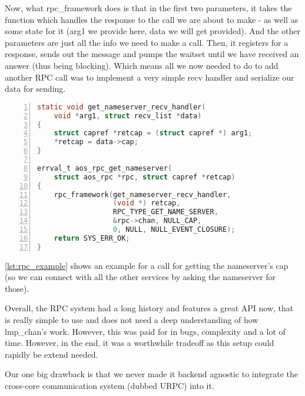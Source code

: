 Now, what rpc\_framework does is that in the first two parameters, it takes 
the function which handles the response to the call we are about to make - as 
well as some state for it (arg1 we provide here, data we will get provided). 
And the other parameters are just all the info we need to make a call.
Then, it registers for a response, sends out the message and 
pumps the waitset until we have received an answer (thus being blocking). 
Which means all we now needed to do to add another RPC call was to implement a 
very simple recv handler and 
serialize our data for sending.
\medskip

\begin{lstlisting}[caption={aos\_rpc\_get with helper function}, 
label=lst:rpc_example, numbers=left, stepnumber=1, float, floatplacement=tl, 
frame=tb, language=c]
static void get_nameserver_recv_handler(
    void *arg1, struct recv_list *data)
{
    struct capref *retcap = (struct capref *) arg1;
    *retcap = data->cap;
}

errval_t aos_rpc_get_nameserver(
    struct aos_rpc *rpc, struct capref *retcap)
{
    rpc_framework(get_nameserver_recv_handler,
                  (void *) retcap,
                  RPC_TYPE_GET_NAME_SERVER, 
                  &rpc->chan, NULL_CAP,
                  0, NULL, NULL_EVENT_CLOSURE);
    return SYS_ERR_OK;
}
\end{lstlisting}

\autoref{lst:rpc_example} shows an example for a call for getting the 
nameserver's cap (so we can connect with all the other services by asking the 
nameserver for those).
\medskip

Overall, the RPC system had a long history and features a great API now, that is really simple to use 
and does not need a deep understanding of how lmp\_chan's work. However, this 
was paid for in bugs, complexity and a lot of time. However, in the end, it was a worthwhile 
tradeoff as this setup could rapidly be extend needed.
\medskip

Our one big drawback is that we never made it backend agnostic to integrate 
the cross-core communication system (dubbed URPC) into it.
